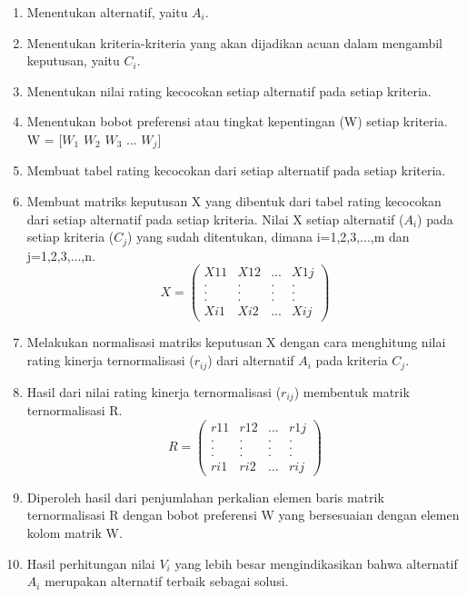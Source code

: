 	\begin{enumerate}
		\item Menentukan alternatif, yaitu $A_{i}$.
		\item Menentukan kriteria-kriteria yang akan dijadikan acuan dalam mengambil keputusan, yaitu $C_{i}$.
		\item Menentukan nilai rating kecocokan setiap alternatif pada setiap kriteria.
		\item Menentukan bobot preferensi atau tingkat kepentingan (W) setiap kriteria. W = [$W_{1}$ $W_{2}$ $W_{3}$ ... $W_{j}$]
		\item Membuat tabel rating kecocokan dari setiap alternatif pada setiap kriteria.
		\item Membuat matriks keputusan X yang dibentuk dari tabel rating kecocokan dari setiap alternatif pada setiap kriteria. Nilai X setiap alternatif ($A_{i}$) pada setiap kriteria ($C_{j}$) yang sudah ditentukan, dimana i=1,2,3,...,m dan j=1,2,3,...,n.
		 \begin{displaymath} X = 
\left (
\begin{array}{rrrr}
X11 & X12 &... &X1j\\		
. & . & . & .\\
. & . & . & .\\
. & . & . & .\\
			Xi1 & Xi2 &... &Xij\end{array}
\right )	
	\end{displaymath}
	\item Melakukan normalisasi matriks keputusan X dengan cara menghitung nilai rating kinerja ternormalisasi ($r_{ij}$) dari alternatif $A_{i}$ pada kriteria $C_{j}$.
	\item Hasil dari nilai rating kinerja ternormalisasi ($r_{ij}$) membentuk matrik ternormalisasi R.\\
	\begin{displaymath} R = 
\left (
\begin{array}{rrrr}
r11 & r12 &... &r1j\\		
. & . & . & .\\
. & . & . & .\\
. & . & . & .\\
			ri1& ri2&... &rij\end{array}\right )	
	\end{displaymath}
	\item Diperoleh hasil dari penjumlahan perkalian elemen baris matrik ternormalisasi R dengan bobot preferensi W yang bersesuaian dengan elemen kolom matrik W. 
	\item Hasil perhitungan nilai $V_{i}$ yang lebih besar mengindikasikan bahwa alternatif $A_{i}$ merupakan alternatif terbaik sebagai solusi.
	\end{enumerate}
	
